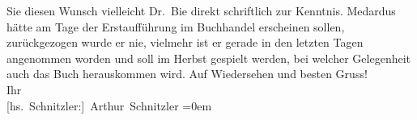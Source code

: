 \begin{ledgroupsized}[t]{13cm}
               Sie diesen Wunsch vielleicht Dr. Bie direkt
               schriftlich zur Kenntnis.\pend
           \pstart
           Medardus hätte am Tage der Erstaufführung im
               Buchhandel erscheinen sollen, zurückgezogen wurde er nie, vielmehr ist er gerade in
               den letzten Tagen angenommen worden und soll im Herbst gespielt werden, bei welcher
               Gelegenheit auch das Buch herauskommen wird.\pend
           \pstart
           Auf Wiedersehen und besten Gruss!{\\[\baselineskip]}Ihr{\\[\baselineskip]}\spacefill\mbox{{[}hs. Schnitzler:{]} Arthur Schnitzler}\pend
           \leftskip=0em{}
         
         \endnumbering{}\end{ledgroupsized}  \newcommand{\dateiname}{L01913}\newcommand{\titel}{Arthur Schnitzler an Albert Ehrenstein, 12. 2. 1910}\newcommand{\editorInnen}{Martin Anton Müller und Gerd-Hermann Susen}
      